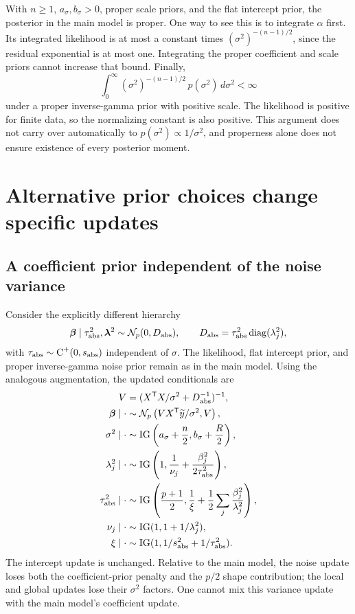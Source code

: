 \documentclass[11pt,letterpaper]{article}
\numberwithin{equation}{section}
\newcommand{\diag}{\operatorname{diag}}
\newcommand{\IG}{\operatorname{IG}}
\newcommand{\HC}{\operatorname{C}^{+}}
\newcommand{\Normal}{\mathcal{N}}
\newcommand{\given}{\mid}
\newcommand{\bbeta}{\bm{\beta}}
\newcommand{\blambda}{\bm{\lambda}}
\newcommand{\trans}{^{\mathsf T}}
\begin{document}
With \(n\geq1\), \(a_\sigma,b_\sigma>0\), proper scale priors, and the
flat intercept prior, the posterior in the main model is proper. One way to
see this is to integrate \(\alpha\) first. Its integrated likelihood is at
most a constant times \((\sigma^2)^{-(n-1)/2}\), since the residual
exponential is at most one. Integrating the proper coefficient and scale
priors cannot increase that bound. Finally,
\[
 \int_0^\infty
 (\sigma^2)^{-(n-1)/2}\,p(\sigma^2)\,d\sigma^2<\infty
\]
under a proper inverse-gamma prior with positive scale. The likelihood is
positive for finite data, so the normalizing constant is also positive.
This argument does not carry over automatically to
\(p(\sigma^2)\propto1/\sigma^2\), and properness alone does not ensure
existence of every posterior moment.

\section{Alternative prior choices change specific updates}\label{app:variants}

\subsection{A coefficient prior independent of the noise variance}

Consider the explicitly different hierarchy
\[
 \bbeta\given\tau_{\rm abs}^2,\blambda^2
 \sim\Normal_p(0,D_{\rm abs}),\qquad
 D_{\rm abs}=\tau_{\rm abs}^2\diag(\lambda_j^2),
\]
with \(\tau_{\rm abs}\sim\HC(0,s_{\rm abs})\) independent of \(\sigma\).
The likelihood, flat intercept prior, and proper inverse-gamma noise prior
remain as in the main model. Using the analogous augmentation, the updated
conditionals are
\begin{align}
 V&=(X\trans X/\sigma^2+D_{\rm abs}^{-1})^{-1},\nonumber\\
 \bbeta\given\cdot&\sim\Normal_p\left(
          VX\trans\widetilde y/\sigma^2,V\right),\\
 \sigma^2\given\cdot&\sim\IG\left(a_\sigma+\frac n2,
                         b_\sigma+\frac R2\right),\\
 \lambda_j^2\given\cdot&\sim\IG\left(1,
               \frac1{\nu_j}+\frac{\beta_j^2}{2\tau_{\rm abs}^2}\right),\\
 \tau_{\rm abs}^2\given\cdot&\sim\IG\left(\frac{p+1}{2},
               \frac1\xi+\frac12\sum_j\frac{\beta_j^2}{\lambda_j^2}\right),\\
 \nu_j\given\cdot&\sim\IG(1,1+1/\lambda_j^2),\\
 \xi\given\cdot&\sim\IG(1,1/s_{\rm abs}^2+1/\tau_{\rm abs}^2).
\end{align}
The intercept update is unchanged. Relative to the main model, the noise
update loses both the coefficient-prior penalty and the \(p/2\) shape
contribution; the local and global updates lose their \(\sigma^2\) factors.
One cannot mix this variance update with the main model's coefficient update.
\end{document}
